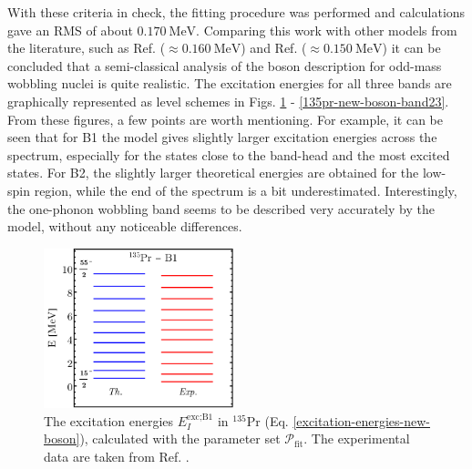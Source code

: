 With these criteria in check, the fitting procedure was performed and calculations gave an RMS of about $0.170\ \text{MeV}$. Comparing this work with other models from the literature, such as Ref. \cite{chen2016wobbling} ($\approx0.160\ \text{MeV}$) and Ref. \cite{budaca2018tilted} ($\approx0.150\ \text{MeV}$) it can be concluded that a semi-classical analysis of the boson description for odd-mass wobbling nuclei is quite realistic. The excitation energies for all three bands are graphically represented as level schemes in Figs. \ref{135pr-new-boson-band1} - \ref{135pr-new-boson-band23}. From these figures, a few points are worth mentioning. For example, it can be seen that for B1 the model gives slightly larger excitation energies across the spectrum, especially for the states close to the band-head and the most excited states. For B2, the slightly larger theoretical energies are obtained for the low-spin region, while the end of the spectrum is a bit underestimated. Interestingly, the one-phonon wobbling band seems to be described very accurately by the model, without any noticeable differences. 
\begin{figure}[t] %
    \centering
    \includegraphics[width=0.49\textwidth]{Chapters/Figures/135Pr-New-Boson-Band1-Energies.pdf}
    \caption{The excitation energies $E_I^\text{exc;B1}$ in $^{135}$Pr (Eq. \ref{excitation-energies-new-boson}), calculated with the parameter set $\mathcal{P}_\text{fit}$. The experimental data are taken from Ref. \cite{sensharma2019two}.}
    \label{135pr-new-boson-band1}
\end{figure}
